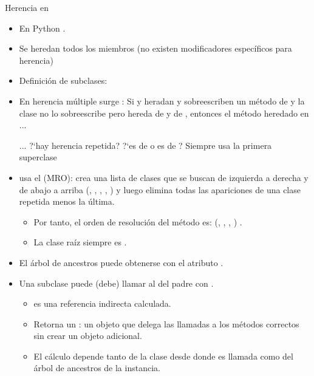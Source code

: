 \documentclass[10pt,envcountsect,spanish]{beamer}
\begin{document}
\begin{frame}{Herencia en } 

\begin{itemize}
\item En Python .

\item Se heredan todos los miembros (no existen modificadores específicos para herencia)

\item Definición de subclases: \\
\centerline{  }

\item En herencia múltiple surge : Si  y  heradan y sobreescriben un método de  y la clase  no lo sobreescribe pero hereda de  y de , entonces el método heredado en  ...\\
\centerline{... ?`hay herencia repetida? ?`es de  o es de ? Siempre usa la primera superclase}

\item  {} usa el  (MRO): crea una lista de clases que se buscan de izquierda a derecha y de abajo a arriba (, , , , ) y luego elimina todas las apariciones de una clase repetida menos la última. 
\begin{itemize}
\item Por tanto, el orden de resolución del método es: (, , , ) . \item La clase raíz siempre es .
\end{itemize}


\item El árbol de ancestros puede obtenerse con el atributo .

\item Una subclase puede (debe) llamar al  del padre con .

\begin{itemize}
\item {} es una referencia indirecta calculada.
\item Retorna un : un objeto que delega las llamadas a los métodos correctos sin crear un objeto adicional.
\item El cálculo depende tanto de la clase desde donde  es llamada como del árbol de ancestros de la instancia. 
\end{itemize}

\end{itemize}

\end{frame}
\end{document}
